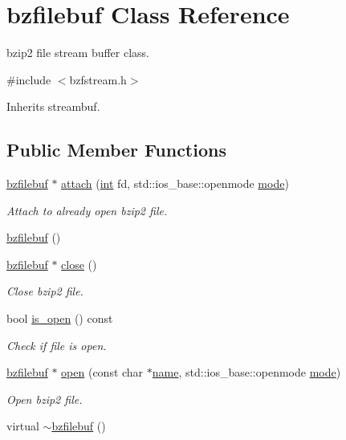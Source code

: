 \hypertarget{classbzfilebuf}{}\section{bzfilebuf Class Reference}
\label{classbzfilebuf}


bzip2 file stream buffer class.  




{\ttfamily \#include $<$bzfstream.\+h$>$}



Inherits streambuf.

\subsection*{Public Member Functions}
\begin{DoxyCompactItemize}
\item 
\hyperlink{classbzfilebuf}{bzfilebuf} $\ast$ \hyperlink{classbzfilebuf_adacbc3f52d2128792ff0c14e5201b3cd}{attach} (\hyperlink{lp__lib_8h_adeb9ec6400320e4923ac9d836d509ddb}{int} fd, std\+::ios\+\_\+base\+::openmode \hyperlink{ioapi_8h_ab77191763734fbb3e515371393ccb606}{mode})
\begin{DoxyCompactList}\small\item\em Attach to already open bzip2 file. \end{DoxyCompactList}\item 
\hyperlink{classbzfilebuf_a1fbb7d1be868faca37feff9594d0bf29}{bzfilebuf} ()
\item 
\hyperlink{classbzfilebuf}{bzfilebuf} $\ast$ \hyperlink{classbzfilebuf_a07ccdb23bcdb2f4cb4d554840427174a}{close} ()
\begin{DoxyCompactList}\small\item\em Close bzip2 file. \end{DoxyCompactList}\item 
bool \hyperlink{classbzfilebuf_adfaac599c0c4e62ad8a3f55080f135e5}{is\+\_\+open} () const
\begin{DoxyCompactList}\small\item\em Check if file is open. \end{DoxyCompactList}\item 
\hyperlink{classbzfilebuf}{bzfilebuf} $\ast$ \hyperlink{classbzfilebuf_a89ba3fdd6fd497f9165a2a3ea2d415d3}{open} (const char $\ast$\hyperlink{lp__lib_8h_a2946c588fc7fa2fa5b43ac54b7872725}{name}, std\+::ios\+\_\+base\+::openmode \hyperlink{ioapi_8h_ab77191763734fbb3e515371393ccb606}{mode})
\begin{DoxyCompactList}\small\item\em Open bzip2 file. \end{DoxyCompactList}\item 
virtual \hyperlink{classbzfilebuf_a3aa5be3f60dc3f5d62deeb49a038fe38}{$\sim$bzfilebuf} ()
\end{DoxyCompactItemize}
